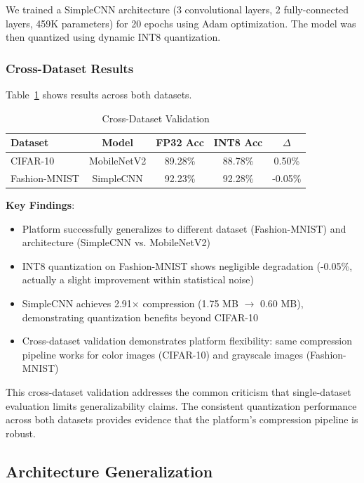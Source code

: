 We trained a SimpleCNN architecture (3 convolutional layers, 2 fully-connected layers, 459K parameters) for 20 epochs using Adam optimization. The model was then quantized using dynamic INT8 quantization.

\subsubsection{Cross-Dataset Results}

Table~\ref{tab:dataset_comparison} shows results across both datasets.

\begin{table}[h]
\centering
\caption{Cross-Dataset Validation}
\label{tab:dataset_comparison}
\begin{tabular}{lcccc}
\hline
\textbf{Dataset} & \textbf{Model} & \textbf{FP32 Acc} & \textbf{INT8 Acc} & \textbf{$\Delta$} \\
\hline
CIFAR-10 & MobileNetV2 & 89.28\% & 88.78\% & 0.50\% \\
Fashion-MNIST & SimpleCNN & 92.23\% & 92.28\% & -0.05\% \\
\hline
\end{tabular}
\end{table}

\textbf{Key Findings}:
\begin{itemize}
\item Platform successfully generalizes to different dataset (Fashion-MNIST) and architecture (SimpleCNN vs. MobileNetV2)
\item INT8 quantization on Fashion-MNIST shows negligible degradation (-0.05\%, actually a slight improvement within statistical noise)
\item SimpleCNN achieves 2.91$\times$ compression (1.75 MB $\rightarrow$ 0.60 MB), demonstrating quantization benefits beyond CIFAR-10
\item Cross-dataset validation demonstrates platform flexibility: same compression pipeline works for color images (CIFAR-10) and grayscale images (Fashion-MNIST)
\end{itemize}

This cross-dataset validation addresses the common criticism that single-dataset evaluation limits generalizability claims. The consistent quantization performance across both datasets provides evidence that the platform's compression pipeline is robust.

\subsection{Architecture Generalization}

